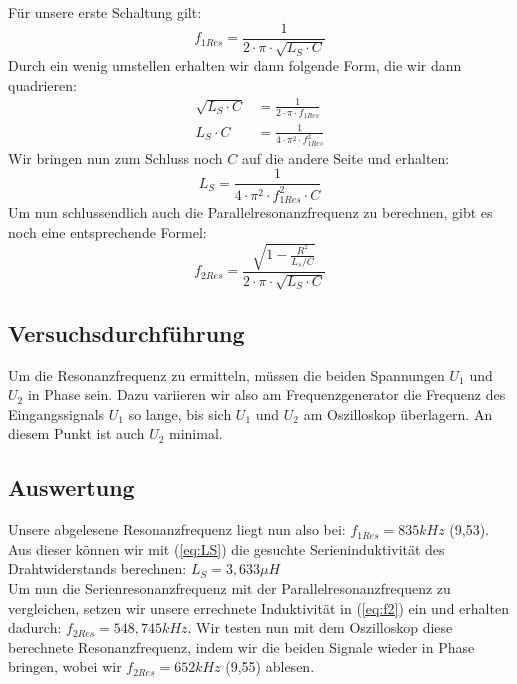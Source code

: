 \documentclass{article}
\begin{document}
Für unsere erste Schaltung gilt:
\begin{equation}
  f_{1Res} = \frac{1}{2\cdot \pi \cdot \sqrt{L_S \cdot C}}
\end{equation}
Durch ein wenig umstellen erhalten wir dann folgende Form, die wir dann quadrieren:
\begin{align*}
  \sqrt{L_S\cdot C} & = \frac{1}{2\cdot\pi \cdot f_{1Res}}    \\
  L_S \cdot C       & = \frac{1}{4\cdot\pi^2\cdot f_{1Res}^2}
\end{align*}
Wir bringen nun zum Schluss noch $C$ auf die andere Seite und erhalten:
\begin{equation}\label{eq:LS}
  L_S = \frac{1}{4\cdot\pi^2\cdot f_{1Res}^2\cdot C}
\end{equation}
Um nun schlussendlich auch die Parallelresonanzfrequenz zu berechnen, gibt es noch eine entsprechende Formel:
\begin{equation}\label{eq:f2}
  f_{2Res} = \frac{\sqrt{1-\frac{R^2}{L_s/C}}}{2\cdot\pi\cdot\sqrt{L_S\cdot C}}
\end{equation}
\subsection{Versuchsdurchführung}
Um die Resonanzfrequenz zu ermitteln, müssen die beiden Spannungen $U_1$ und $U_2$ in Phase sein.
Dazu variieren wir also am Frequenzgenerator die Frequenz des Eingangssignals $U_1$ so lange, bis sich
$U_1$ und $U_2$ am Oszilloskop überlagern. An diesem Punkt ist auch $U_2$ minimal.

\subsection{Auswertung}

Unsere abgelesene Resonanzfrequenz liegt nun also bei: $f_{1Res} = 835kHz$ (9,53).
Aus dieser können wir mit (\ref{eq:LS}) die gesuchte Serieninduktivität des Drahtwiderstands berechnen: $L_S = 3,633\mu H$\\[3pt]
Um nun die Serienresonanzfrequenz mit der Parallelresonanzfrequenz zu vergleichen, setzen wir unsere errechnete Induktivität in
(\ref{eq:f2}) ein und erhalten dadurch: $f_{2Res} = 548,745kHz$. Wir testen nun mit dem Oszilloskop diese berechnete Resonanzfrequenz, indem wir
die beiden Signale wieder in Phase bringen, wobei wir $f_{2Res} = 652kHz$ (9,55) ablesen.


\newpage
\end{document}

